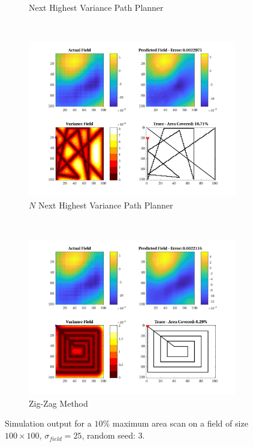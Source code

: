 \begin{figure}[htb!]
\begin{subfigure}[t]{0.5\textwidth}
        \captionsetup{skip=0.10\baselineskip,size=footnotesize}
        \caption{Next Highest Variance Path Planner}
    \end{subfigure}%
    \\
    \begin{subfigure}[t]{0.5\textwidth}
        \centering
        \includegraphics[width=\linewidth]{figures/hbresults/nnhv_10p_100x100_sf_25_seed_3.png}
        \captionsetup{skip=0.10\baselineskip,size=footnotesize}
        \caption{$N$ Next Highest Variance Path Planner}
    \end{subfigure}%
    ~
    \begin{subfigure}[t]{0.5\textwidth}
        \centering
        \includegraphics[width=\linewidth]{figures/hbresults/zz_10p_100x100_sf_25_seed_3.png}
        \captionsetup{skip=0.10\baselineskip,size=footnotesize}
        \caption{Zig-Zag Method}
    \end{subfigure}%
    \captionsetup{skip=0.20\baselineskip}
    \caption{Simulation output for a $10\%$ maximum area scan on a field of size $100 \times 100$, $\sigma_{field} = 25$, random seed: 3.}
    \label{fig:sim_sigma25_p10_s3}
\end{figure}

